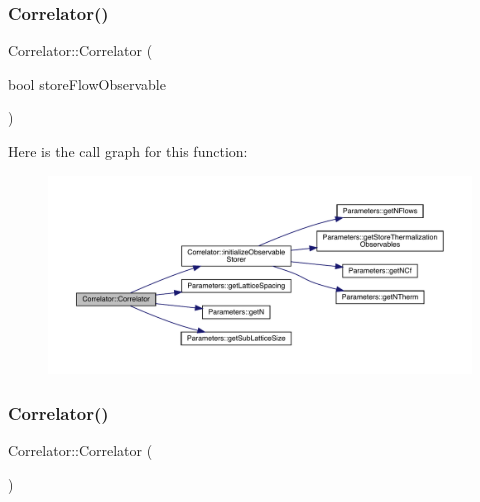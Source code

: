 \subsubsection{\texorpdfstring{Correlator()}{Correlator()}\hspace{0.1cm}{\footnotesize\ttfamily [1/2]}}
{\footnotesize\ttfamily Correlator\+::\+Correlator (\begin{DoxyParamCaption}\item[{bool}]{store\+Flow\+Observable }\end{DoxyParamCaption})}

Here is the call graph for this function\+:\nopagebreak
\begin{figure}[H]
\begin{center}
\leavevmode
\includegraphics[width=350pt]{class_correlator_aff48ef3bf789e9c6231eacc21cd9ed9a_cgraph}
\end{center}
\end{figure}
\mbox{\label{class_correlator_a6114955836dba0b4b61138490cd3fe91}} 
\subsubsection{\texorpdfstring{Correlator()}{Correlator()}\hspace{0.1cm}{\footnotesize\ttfamily [2/2]}}
{\footnotesize\ttfamily Correlator\+::\+Correlator (\begin{DoxyParamCaption}{ }\end{DoxyParamCaption})}

